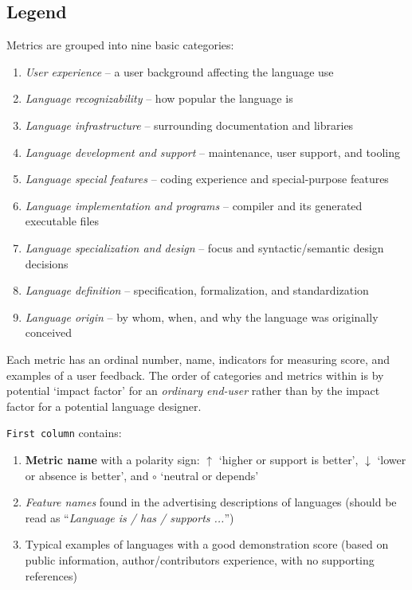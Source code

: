 \documentclass[11pt]{article}
\begin{document}
\subsection*{Legend}

Metrics are grouped into nine basic categories:

\vspace{-5pt}
\begin{enumerate}
    \setlength\itemsep{-3pt}
    \item \textit{User experience} -- a user background affecting the language use
    \item \textit{Language recognizability} -- how popular the language is
    \item \textit{Language infrastructure} -- surrounding documentation and libraries
    \item \textit{Language development and support} -- maintenance, user support, and tooling
    \item \textit{Language special features} -- coding experience and special-purpose features
    \item \textit{Language implementation and programs} -- compiler and its generated executable files
    \item \textit{Language specialization and design} -- focus and syntactic/semantic design decisions
    \item \textit{Language definition} -- specification, formalization, and standardization
    \item \textit{Language origin} -- by whom, when, and why the language was originally conceived
\end{enumerate}
\vspace{-5pt}

Each metric has an ordinal number, name, indicators for measuring score, and examples of a user feedback. The order of categories and metrics within is by potential `impact factor' for an \textit{ordinary end-user} rather than by the impact factor for a potential language designer. 

\smallskip

\noindent\texttt{First column} contains:

\vspace{-5pt}
\begin{enumerate}
    \setlength\itemsep{-3pt}
    \item \textbf{Metric name} with a polarity sign: $\uparrow$ `higher or support is better', $\downarrow$ `lower or absence is better', and $\circ$ `neutral or depends'
    \item \textit{Feature names} found in the advertising descriptions of languages (should be read as ``\textit{Language is / has / supports ...}'')
    \item \textcolor{gray!90}{Typical examples} of languages with a good demonstration score (based on public information, author/contributors experience, with no supporting references)
\end{enumerate}
\vspace{-5pt}
\end{document}
